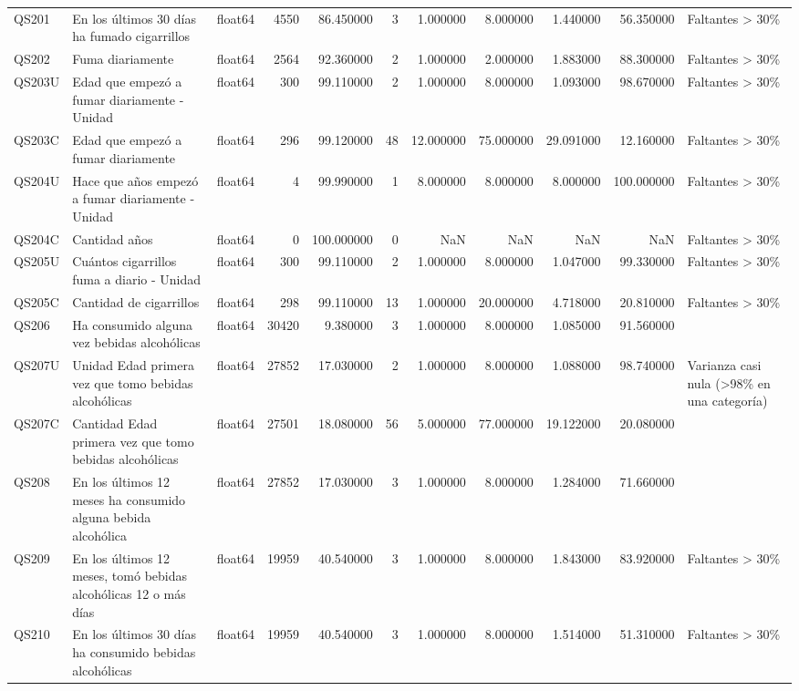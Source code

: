 \begin{longtable}{lllrrrrrrrl}
QS201 & En los últimos 30 días ha fumado cigarrillos & float64 & 4550 & 86.450000 & 3 & 1.000000 & 8.000000 & 1.440000 & 56.350000 & Faltantes > 30\% \\
QS202 & Fuma diariamente & float64 & 2564 & 92.360000 & 2 & 1.000000 & 2.000000 & 1.883000 & 88.300000 & Faltantes > 30\% \\
QS203U & Edad que empezó a fumar diariamente - Unidad & float64 & 300 & 99.110000 & 2 & 1.000000 & 8.000000 & 1.093000 & 98.670000 & Faltantes > 30\% \\
QS203C & Edad que empezó a fumar diariamente & float64 & 296 & 99.120000 & 48 & 12.000000 & 75.000000 & 29.091000 & 12.160000 & Faltantes > 30\% \\
QS204U & Hace que años empezó a fumar diariamente - Unidad & float64 & 4 & 99.990000 & 1 & 8.000000 & 8.000000 & 8.000000 & 100.000000 & Faltantes > 30\% \\
QS204C & Cantidad años & float64 & 0 & 100.000000 & 0 & NaN & NaN & NaN & NaN & Faltantes > 30\% \\
QS205U & Cuántos cigarrillos fuma a diario - Unidad & float64 & 300 & 99.110000 & 2 & 1.000000 & 8.000000 & 1.047000 & 99.330000 & Faltantes > 30\% \\
QS205C & Cantidad de cigarrillos & float64 & 298 & 99.110000 & 13 & 1.000000 & 20.000000 & 4.718000 & 20.810000 & Faltantes > 30\% \\
QS206 & Ha consumido alguna vez bebidas alcohólicas & float64 & 30420 & 9.380000 & 3 & 1.000000 & 8.000000 & 1.085000 & 91.560000 &  \\
QS207U & Unidad Edad primera vez que tomo bebidas alcohólicas & float64 & 27852 & 17.030000 & 2 & 1.000000 & 8.000000 & 1.088000 & 98.740000 & Varianza casi nula (>98\% en una categoría) \\
QS207C & Cantidad  Edad primera vez que tomo bebidas alcohólicas & float64 & 27501 & 18.080000 & 56 & 5.000000 & 77.000000 & 19.122000 & 20.080000 &  \\
QS208 & En los últimos 12 meses ha consumido alguna bebida alcohólica & float64 & 27852 & 17.030000 & 3 & 1.000000 & 8.000000 & 1.284000 & 71.660000 &  \\
QS209 & En los últimos 12 meses, tomó bebidas alcohólicas 12 o más días & float64 & 19959 & 40.540000 & 3 & 1.000000 & 8.000000 & 1.843000 & 83.920000 & Faltantes > 30\% \\
QS210 & En los últimos 30 días ha consumido bebidas alcohólicas & float64 & 19959 & 40.540000 & 3 & 1.000000 & 8.000000 & 1.514000 & 51.310000 & Faltantes > 30\% \\

\end{longtable}

